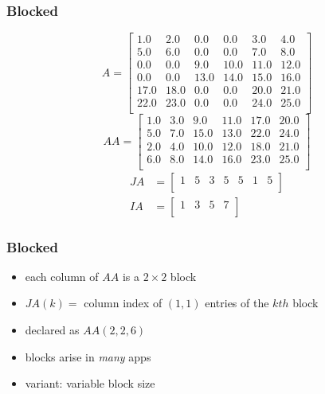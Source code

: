 \documentclass[10pt]{beamer}
\begin{document}
\begin{frame}
\frametitle{Blocked}
\begin{equation*}
A=
\begin{bmatrix}
1.0 &  2.0 &  0.0 &  0.0 &  3.0 &  4.0 \\
5.0 &  6.0 &  0.0 &  0.0 &  7.0 &  8.0 \\
0.0 &   0.0 &  9.0 & 10.0 & 11.0 & 12.0 \\
0.0 &   0.0 & 13.0 & 14.0 & 15.0 & 16.0 \\
17.0 & 18.0 & 0.0 &  0.0 &  20.0 & 21.0 \\
22.0 & 23.0 & 0.0 &   0.0 & 24.0 & 25.0 \\
\end{bmatrix}
\end{equation*}
\begin{equation*}
  AA = 
\begin{bmatrix}
  1.0 & 3.0 & 9.0 & 11.0 & 17.0 & 20.0\\
  5.0 & 7.0 & 15.0 & 13.0 & 22.0 & 24.0\\
  2.0 & 4.0 & 10.0 & 12.0 & 18.0 & 21.0\\
 6.0 & 8.0 & 14.0 & 16.0 & 23.0 & 25.0\\
\end{bmatrix}
\end{equation*}
\begin{align*}
  JA &= 
\begin{bmatrix}
  1 & 5 & 3 & 5 & 5 & 1 & 5\\
\end{bmatrix}\\
  IA &= 
\begin{bmatrix}
  1 & 3 & 5 & 7\\
\end{bmatrix}
\end{align*}
\end{frame}
\begin{frame}
\frametitle{Blocked}
  \begin{itemize}
    \item each column of $AA$ is a $2\times 2$ block
    \item $JA(k) = $ column index of $(1,1)$ entries of the $kth$ block
    \item declared as $AA(2,2,6)$
    \item blocks arise in \emph{many} apps
    \item variant: variable block size
  \end{itemize}
\end{frame}
\end{document}
